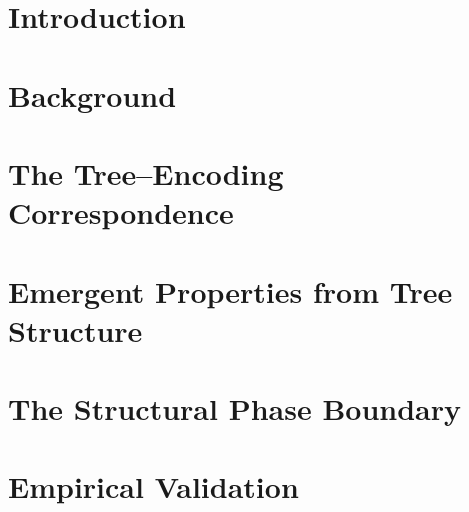 \documentclass[aps,pra,twocolumn,superscriptaddress,showpacs]{revtex4-2}
\theoremstyle{definition}
\begin{document}
\section{Introduction}
\label{sec:intro}


\section{Background}
\label{sec:background}


\section{The Tree--Encoding Correspondence}
\label{sec:tree-encoding}


\section{Emergent Properties from Tree Structure}
\label{sec:emergence}


\section{The Structural Phase Boundary}
\label{sec:phase-boundary}


\section{Empirical Validation}
\label{sec:validation}

\end{document}
